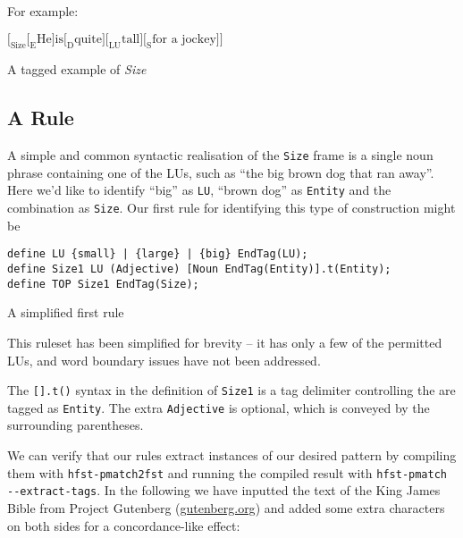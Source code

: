 \documentclass{llncs}
\begin{document}
For example:

\begin{table}[h]

\begin{math}
\Big[_{\text{Size}}\Big[_{\text{E}}\text{He} \Big]
  \text{is} \Big[_{\text{D}} \text{quite} \Big] \Big[_{\text{LU}}\text{tall} \Big]
  \Big[_{\text{S}} \text{for a jockey} \Big] \Big]
\end{math}
\caption{A tagged example of \emph{Size}}
\end{table}

\subsection{A Rule}

A simple and common syntactic realisation of the \verb+Size+ frame is a single
noun phrase containing one of the LUs, such as
``the big brown dog that ran away''. Here we'd like to identify ``big'' as \verb+LU+,
``brown dog'' as \verb+Entity+ and the combination as \verb+Size+.
Our first rule for identifying this type of construction might be

\begin{table}[h]
  \small
  \begin{framed}
\begin{verbatim}
define LU {small} | {large} | {big} EndTag(LU);
define Size1 LU (Adjective) [Noun EndTag(Entity)].t(Entity);
define TOP Size1 EndTag(Size);  
\end{verbatim}
\end{framed}
\normalsize
\caption{A simplified first rule}
\end{table}

This ruleset has been simplified for brevity -- it has only a few of the
permitted LUs, and word boundary issues have not been addressed.

The \verb+[].t()+ syntax in the definition of \verb+Size1+ is a tag delimiter
controlling the are tagged as \verb+Entity+. The extra \verb+Adjective+ is
optional, which is conveyed by the surrounding parentheses.

We can verify that our rules extract instances of our desired pattern by compiling
them with \verb+hfst-pmatch2fst+ and running the compiled result with
\verb+hfst-pmatch --extract-tags+. In the following we have
inputted the text of the King James Bible from Project
Gutenberg (\url{gutenberg.org}) and added some extra characters on both
sides for
a concordance-like effect:
\end{document}
